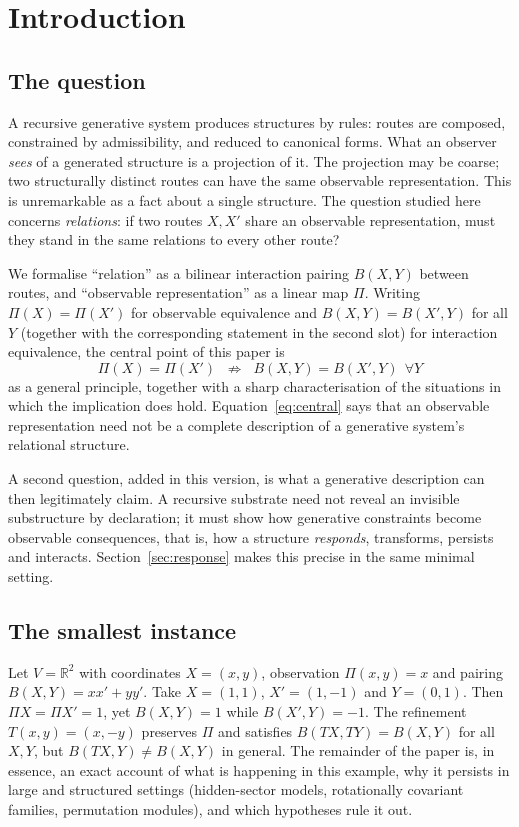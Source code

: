 \documentclass[11pt,a4paper]{article}
\newcommand{\RR}{\mathbb{R}}
\theoremstyle{plain}
\theoremstyle{definition}
\begin{document}
\tableofcontents
\newpage

\section{Introduction}\label{sec:intro}

\subsection{The question}
A recursive generative system produces structures by rules: routes are composed, constrained by admissibility, and reduced to canonical forms.
What an observer \emph{sees} of a generated structure is a projection of it.
The projection may be coarse; two structurally distinct routes can have the same observable representation.
This is unremarkable as a fact about a single structure.
The question studied here concerns \emph{relations}: if two routes $X,X'$ share an observable representation, must they stand in the same relations to every other route?

We formalise ``relation'' as a bilinear interaction pairing $B(X,Y)$ between routes, and ``observable representation'' as a linear map $\Pi$.
Writing $\Pi(X)=\Pi(X')$ for observable equivalence and $B(X,Y)=B(X',Y)$ for all $Y$ (together with the corresponding statement in the second slot) for interaction equivalence, the central point of this paper is
\begin{equation}\label{eq:central}
\boxed{\;\Pi(X)=\Pi(X')\;\;\not\Rightarrow\;\; B(X,Y)=B(X',Y)\ \ \forall Y\;}
\end{equation}
as a general principle, together with a sharp characterisation of the situations in which the implication does hold.
Equation~\eqref{eq:central} says that an observable representation need not be a complete description of a generative system's relational structure.

A second question, added in this version, is what a generative description can then legitimately claim. A recursive substrate need not reveal an invisible substructure by declaration; it must show how generative constraints become observable consequences, that is, how a structure \emph{responds}, transforms, persists and interacts. Section~\ref{sec:response} makes this precise in the same minimal setting.

\subsection{The smallest instance}\label{sec:smallest}
Let $V=\RR^2$ with coordinates $X=(x,y)$, observation $\Pi(x,y)=x$ and pairing $B(X,Y)=xx'+yy'$.
Take $X=(1,1)$, $X'=(1,-1)$ and $Y=(0,1)$.
Then $\Pi X=\Pi X'=1$, yet $B(X,Y)=1$ while $B(X',Y)=-1$.
The refinement $T(x,y)=(x,-y)$ preserves $\Pi$ and satisfies $B(TX,TY)=B(X,Y)$ for all $X,Y$, but $B(TX,Y)\neq B(X,Y)$ in general.
The remainder of the paper is, in essence, an exact account of what is happening in this example, why it persists in large and structured settings (hidden-sector models, rotationally covariant families, permutation modules), and which hypotheses rule it out.
\end{document}
